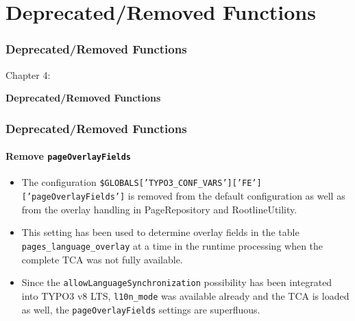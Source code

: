 %

\section{Deprecated/Removed Functions}
\begin{frame}[fragile]
	\frametitle{Deprecated/Removed Functions}

	\begin{center}\huge{Chapter 4:}\end{center}
	\begin{center}\huge{\color{typo3darkgrey}\textbf{Deprecated/Removed Functions}}\end{center}

\end{frame}


\begin{frame}[fragile]
	\frametitle{Deprecated/Removed Functions}
	\framesubtitle{Remove \texttt{pageOverlayFields}}

	\begin{itemize}
		\item The configuration \texttt{\$GLOBALS['TYPO3\_CONF\_VARS']['FE']['pageOverlayFields']}
			is removed from the default configuration as well as from the overlay handling in
			PageRepository and RootlineUtility.

		\item This setting has been used to determine overlay fields in the table
			\texttt{pages\_language\_overlay} at a time in the runtime processing when the complete
			TCA was not fully available.

		\item Since the \texttt{allowLanguageSynchronization} possibility has been integrated into
			TYPO3 v8 LTS, \texttt{l10n\_mode} was available already and the TCA is loaded as well, the
			\texttt{pageOverlayFields} settings are superfluous.

	\end{itemize}

\end{frame}

